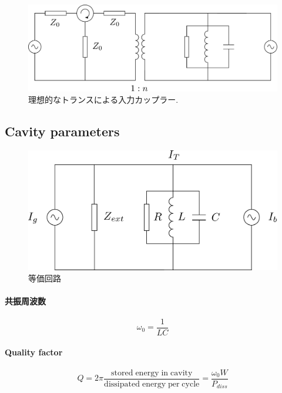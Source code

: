 \documentclass[book]{jlreq}
\begin{document}
\begin{figure}[hbt]
    \begin{center}
        \includegraphics[width=12cm,clip]{figs/Cavity_Model.pdf}
        \caption{理想的なトランスによる入力カップラー.}
        \label{Cavity_Model}
    \end{center}
\end{figure}

\subsection{Cavity parameters}

\begin{figure}[hbt]
    \begin{center}
        \includegraphics[width=12cm,clip]{figs/Equivalent_Circuit}
        \caption{等価回路}
        \label{Equivalent_Circuit}
    \end{center}
\end{figure}
%
\paragraph{共振周波数}
%
\begin{equation}
    \omega_0 = \frac{1}{L C}
\end{equation}
%
\paragraph{Quality factor}
%
\begin{equation}
    Q = 2\pi \frac{\mathrm{stored\;energy\;in\;cavity}}{\mathrm{dissipated \; energy\;per\;cycle}} = \frac{\omega_0 W}{P_{diss}}
\end{equation}
%
\end{document}
